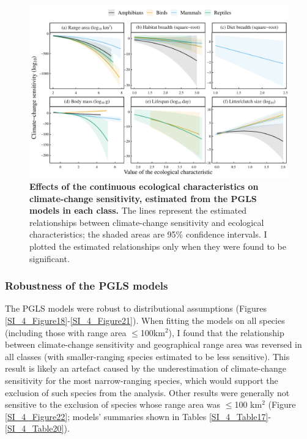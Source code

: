 \clearpage
\begin{figure}[h!]
\centering
\includegraphics[scale=0.7]{figures/Chapter4/Figure6}
\caption[Effects of the continuous ecological characteristics on climate-change sensitivity, estimated from the PGLS models in each class.]{\textbf{Effects of the continuous ecological characteristics on climate-change sensitivity, estimated from the PGLS models in each class.} The lines represent the estimated relationships between climate-change sensitivity and ecological characteristics; the shaded areas are 95\% confidence intervals. I plotted the estimated relationships only when they were found to be significant.}
\label{chap4_fig6}
\end{figure}

\subsubsection{Robustness of the PGLS models}
The PGLS models were robust to distributional assumptions (Figures \ref{SI_4_Figure18}-\ref{SI_4_Figure21}). When fitting the models on all species (including those with range area $\leq$100km$^2$), I found that the relationship between climate-change sensitivity and geographical range area was reversed in all classes (with smaller-ranging species estimated to be less sensitive). This result is likely an artefact caused by the underestimation of climate-change sensitivity for the most narrow-ranging species, which would support the exclusion of such species from the analysis. Other results were generally not sensitive to the exclusion of species whose range area was $\leq$100 km$^2$ (Figure \ref{SI_4_Figure22}; models' summaries shown in Tables \ref{SI_4_Table17}-\ref{SI_4_Table20}).

